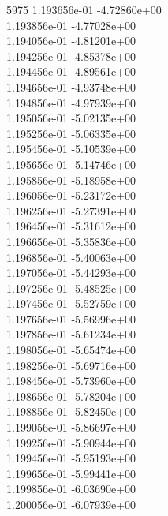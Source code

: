 5975	1.193656e-01	-4.72860e+00	\\ 	1.193856e-01	-4.77028e+00	\\ 	1.194056e-01	-4.81201e+00	\\ 	1.194256e-01	-4.85378e+00	\\ 	1.194456e-01	-4.89561e+00	\\ 	1.194656e-01	-4.93748e+00	\\ 	1.194856e-01	-4.97939e+00	\\ 	1.195056e-01	-5.02135e+00	\\ 	1.195256e-01	-5.06335e+00	\\ 	1.195456e-01	-5.10539e+00	\\ 	1.195656e-01	-5.14746e+00	\\ 	1.195856e-01	-5.18958e+00	\\ 	1.196056e-01	-5.23172e+00	\\ 	1.196256e-01	-5.27391e+00	\\ 	1.196456e-01	-5.31612e+00	\\ 	1.196656e-01	-5.35836e+00	\\ 	1.196856e-01	-5.40063e+00	\\ 	1.197056e-01	-5.44293e+00	\\ 	1.197256e-01	-5.48525e+00	\\ 	1.197456e-01	-5.52759e+00	\\ 	1.197656e-01	-5.56996e+00	\\ 	1.197856e-01	-5.61234e+00	\\ 	1.198056e-01	-5.65474e+00	\\ 	1.198256e-01	-5.69716e+00	\\ 	1.198456e-01	-5.73960e+00	\\ 	1.198656e-01	-5.78204e+00	\\ 	1.198856e-01	-5.82450e+00	\\ 	1.199056e-01	-5.86697e+00	\\ 	1.199256e-01	-5.90944e+00	\\ 	1.199456e-01	-5.95193e+00	\\ 	1.199656e-01	-5.99441e+00	\\ 	1.199856e-01	-6.03690e+00	\\ 	1.200056e-01	-6.07939e+00	\\ \hline
